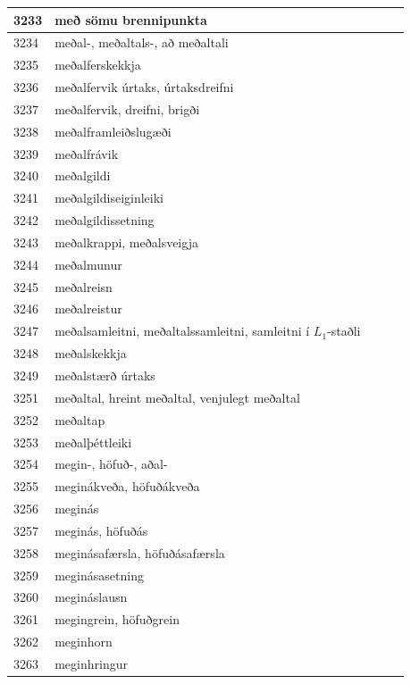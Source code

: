 \begin{longtable}{p{}|p{}|p{}|p{}|p{}}
\hline
3233 & með sömu brennipunkta &  &  &  \\
\hline
3234 & meðal-, meðaltals-, að meðaltali &  &  &  \\
\hline
3235 & meðalferskekkja &  &  &  \\
\hline
3236 & meðalfervik úrtaks, úrtaksdreifni &  &  &  \\
\hline
3237 & meðalfervik, dreifni, brigði &  &  &  \\
\hline
3238 & meðalframleiðslugæði &  &  &  \\
\hline
3239 & meðalfrávik &  &  &  \\
\hline
3240 & meðalgildi &  &  &  \\
\hline
3241 & meðalgildiseiginleiki &  &  &  \\
\hline
3242 & meðalgildissetning &  &  &  \\
\hline
3243 & meðalkrappi, meðalsveigja &  &  &  \\
\hline
3244 & meðalmunur &  &  &  \\
\hline
3245 & meðalreisn &  &  &  \\
\hline
3246 & meðalreistur &  &  &  \\
\hline
3247 & meðalsamleitni, meðaltalssamleitni, samleitni í \(L_1\)-staðli &  &  &  \\
\hline
3248 & meðalskekkja &  &  &  \\
\hline
3249 & meðalstærð úrtaks &  &  &  \\
\hline
3251 & meðaltal, hreint meðaltal, venjulegt meðaltal &  &  &  \\
\hline
3252 & meðaltap &  &  &  \\
\hline
3253 & meðalþéttleiki &  &  &  \\
\hline
3254 & megin-, höfuð-, aðal- &  &  &  \\
\hline
3255 & meginákveða, höfuðákveða &  &  &  \\
\hline
3256 & meginás &  &  &  \\
\hline
3257 & meginás, höfuðás &  &  &  \\
\hline
3258 & meginásafærsla, höfuðásafærsla &  &  &  \\
\hline
3259 & meginásasetning &  &  &  \\
\hline
3260 & megináslausn &  &  &  \\
\hline
3261 & megingrein, höfuðgrein &  &  &  \\
\hline
3262 & meginhorn &  &  &  \\
\hline
3263 & meginhringur &  &  &  \\

\end{longtable}
